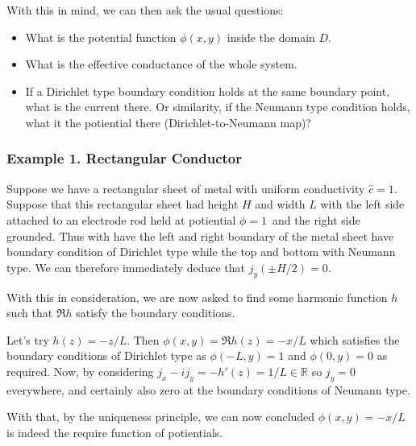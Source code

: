 \documentclass[]{article}
\begin{document}
With this in mind, we can then ask the usual questions:

\begin{itemize}
\item
  What is the potential function \(\phi(x,y)\) inside the domain \(D\).
\item
  What is the effective conductance of the whole system.
\item
  If a Dirichlet type boundary condition holds at the same boundary
  point, what is the current there. Or similarity, if the Neumann type
  condition holds, what it the potiential there (Dirichlet-to-Neumann
  map)?
\end{itemize}

\subsubsection{Example 1. Rectangular
Conductor}\label{example-1.-rectangular-conductor}

Suppose we have a rectangular sheet of metal with uniform conductivity
\(\hat{c} = 1\). Suppose that this rectangular sheet had height \(H\)
and width \(L\) with the left side attached to an electrode rod held at
potiential \(\phi = 1\)~and the right side grounded. Thus with have the
left and right boundary of the metal sheet have boundary condition of
Dirichlet type while the top and bottom with Neumann type. We can
therefore immediately deduce that \(j_y(\pm H/2) = 0\).

With this in consideration, we are now asked to find some harmonic
function \(h\) such that \(\Re h\) satisfy the boundary conditions.

Let's try \(h(z)= -z/L\). Then \(\phi(x, y) = \Re h(z) = - x/L\) which
satisfies the boundary conditions of Dirichlet type as
\(\phi(-L, y) = 1\) and \(\phi(0, y) = 0\) as required. Now, by
considering \(j_x - ij_y = -h'(z) = 1/L \in \mathbb{R}\) so \(j_y = 0\)
everywhere, and certainly also zero at the boundary conditions of
Neumann type.

With that, by the uniqueness principle, we can now concluded
\(\phi(x, y) = - x/L\) is indeed the require function of potientials.
\end{document}
